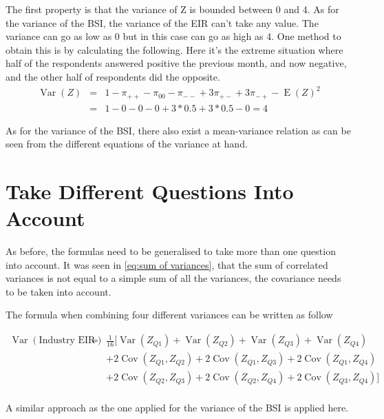 \documentclass[12pt,a4paper,oneside]{book}
\DeclareMathOperator{\Var}{Var}
\DeclareMathOperator{\Cov}{Cov}
\DeclareMathOperator{\E}{E}
\begin{document}
The first property is that the variance of Z is bounded between 0 and 4.
As for the variance of the BSI, the variance of the EIR can't take any value.
The variance can go as low as 0 but in this case can go as high as 4. One method to obtain this is by calculating the following. Here it's the extreme situation where half of the respondents answered positive the previous month, and now negative, and the other half of respondents did the opposite.
\begin{eqnarray}
\Var(Z) &=& 1 - \pi_{++} - \pi_{00} - \pi_{--} + 3\pi_{+-} + 3\pi_{-+} - \E(Z)^2 \nonumber \\
    &=& 1 - 0 - 0 - 0 + 3*0.5 + 3*0.5 - 0 = 4 \nonumber
\end{eqnarray}

As for the variance of the BSI, there also exist a mean-variance relation as can be seen from the different equations of the variance at hand.




\section{Take Different Questions Into Account}

As before, the formulas need to be generalised to take more than one question into account.
It was seen in \autoref{eq:sum of variances}, that the sum of correlated variances is not equal to a simple sum of all the variances, the covariance needs to be taken into account.

The formula when combining four different variances can be written as follow

\begin{eqnarray}
    \Var \left( \text{Industry EIR} \right) 
    &=& \frac{1}{16} \Big[ \Var(Z_{Q1}) + \Var(Z_{Q2}) + \Var(Z_{Q3}) + \Var(Z_{Q4}) \nonumber \\
    && + 2 \Cov (Z_{Q1},Z_{Q2}) + 2 \Cov (Z_{Q1},Z_{Q3}) + 2 \Cov (Z_{Q1},Z_{Q4}) \nonumber \\
    &&  + 2 \Cov (Z_{Q2},Z_{Q3}) + 2 \Cov (Z_{Q2},Z_{Q4}) + 2 \Cov (Z_{Q3},Z_{Q4}) \Big] \nonumber \\
\end{eqnarray}


A similar approach as the one applied for the variance of the BSI is applied here.
\end{document}
